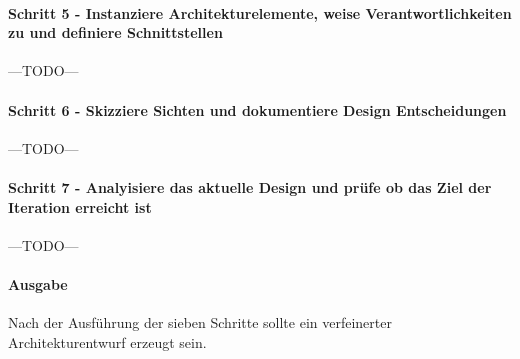 \paragraph{Schritt 5 - Instanziere Architekturelemente, weise Verantwortlichkeiten zu und definiere Schnittstellen}
---TODO---\\
\paragraph{Schritt 6 - Skizziere Sichten und dokumentiere Design Entscheidungen}
---TODO---\\
\paragraph{Schritt 7 - Analyisiere das aktuelle Design und prüfe ob das Ziel der Iteration erreicht ist}
---TODO---\\
\paragraph{Ausgabe}
Nach der Ausführung der sieben Schritte sollte ein verfeinerter Architekturentwurf erzeugt sein.